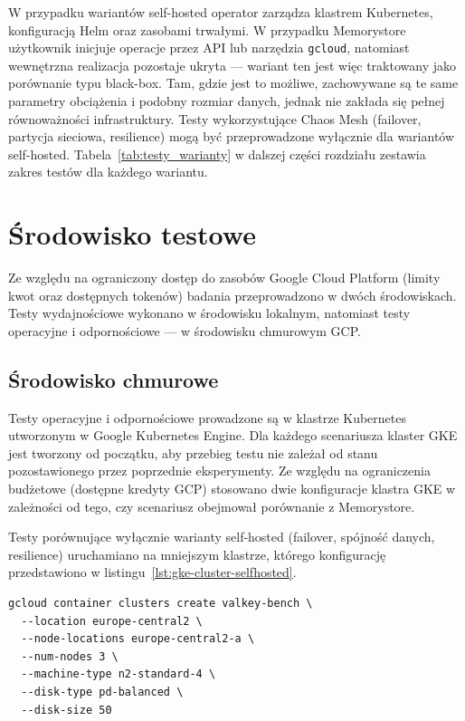 W przypadku wariantów self-hosted operator zarządza klastrem Kubernetes, konfiguracją Helm oraz zasobami trwałymi. W przypadku Memorystore użytkownik inicjuje operacje przez API lub narzędzia \texttt{gcloud}, natomiast wewnętrzna realizacja pozostaje ukryta --- wariant ten jest więc traktowany jako porównanie typu black-box. Tam, gdzie jest to możliwe, zachowywane są te same parametry obciążenia i podobny rozmiar danych, jednak nie zakłada się pełnej równoważności infrastruktury. Testy wykorzystujące Chaos Mesh (failover, partycja sieciowa, resilience) mogą być przeprowadzone wyłącznie dla wariantów self-hosted. Tabela~\ref{tab:testy_warianty} w dalszej części rozdziału zestawia zakres testów dla każdego wariantu.

\section{Środowisko testowe}

Ze względu na ograniczony dostęp do zasobów Google Cloud Platform (limity kwot oraz dostępnych tokenów) badania przeprowadzono w dwóch środowiskach. Testy wydajnościowe wykonano w środowisku lokalnym, natomiast testy operacyjne i odpornościowe --- w środowisku chmurowym GCP.

\subsection{Środowisko chmurowe}

Testy operacyjne i odpornościowe prowadzone są w klastrze Kubernetes utworzonym w Google Kubernetes Engine. Dla każdego scenariusza klaster GKE jest tworzony od początku, aby przebieg testu nie zależał od stanu pozostawionego przez poprzednie eksperymenty. Ze względu na ograniczenia budżetowe (dostępne kredyty GCP) stosowano dwie konfiguracje klastra GKE w zależności od tego, czy scenariusz obejmował porównanie z Memorystore.

Testy porównujące wyłącznie warianty self-hosted (failover, spójność danych, resilience) uruchamiano na mniejszym klastrze, którego konfigurację przedstawiono w listingu~\ref{lst:gke-cluster-selfhosted}.

\begin{lstlisting}[basicstyle=\ttfamily\footnotesize,columns=fullflexible,keepspaces=true,breaklines=true,breakatwhitespace=true,frame=single,framerule=0.2pt,caption={Klaster GKE dla testów self-hosted},label={lst:gke-cluster-selfhosted}]
gcloud container clusters create valkey-bench \
  --location europe-central2 \
  --node-locations europe-central2-a \
  --num-nodes 3 \
  --machine-type n2-standard-4 \
  --disk-type pd-balanced \
  --disk-size 50
\end{lstlisting}

